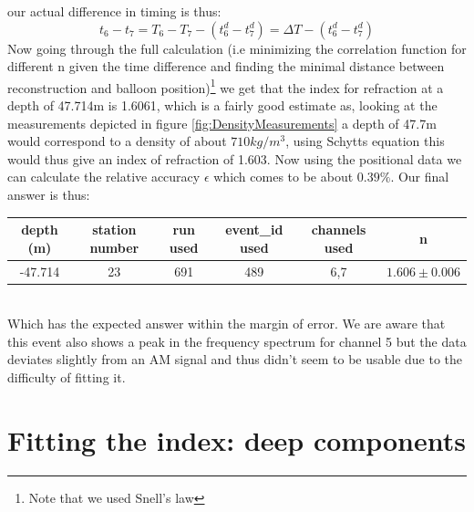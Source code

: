 \documentclass[11pt,a4paper,faculty=we,language=en,doctype=report]{cls/ugent-doc}
\begin{document}
our actual difference
in timing is thus:
\begin{equation}
	t_6 - t_7 = T_6 - T_7 - (t_6^d - t_7^d) = \Delta T - (t_6^d - t_7^d)
\end{equation}
Now going through the full calculation (i.e minimizing the correlation function
for different n given the time difference and finding the minimal distance
between reconstruction and balloon position)\footnote{Note that we used Snell's
law} we get that the index for refraction at a depth of 47.714m is 1.6061,
which is a fairly good estimate as, looking at the measurements depicted in
figure \ref{fig:DensityMeasurements} a depth of 47.7m would correspond to a
density of about $710 kg/m^3$, using Schytts equation this would thus give an
index of refraction of 1.603.  Now using the positional data we can calculate
the relative accuracy $\epsilon$ which comes to be about $0.39\%$. Our final
answer is thus:
\begin{table}[h]
    \centering
    \begin{tabular}{c|c|c|c|c|c}
      depth (m)& station number & run used & event\_id used & channels used & n\\
      \hline
      -47.714 & 23 & 691 & 489 & 6,7 & $1.606 \pm 0.006$
    \end{tabular}
\end{table}\\
Which has the expected answer within the margin of error. We are aware that this event 
also shows a peak in the frequency spectrum for channel 5 but the data deviates slightly
from an AM signal and thus didn't seem to be usable due to the difficulty of fitting it. 
\newpage
\section{Fitting the index: deep components}
\end{document}
